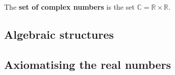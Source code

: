 

\begin{definition}
\label{defComplexNumbersFromReals}
The \textbf{set of complex numbers} is the set $\mathbb{C} = \mathbb{R} \times \mathbb{R}$.
\end{definition}



\subsection*{Algebraic structures}


\subsection*{Axiomatising the real numbers}

\todo{}

